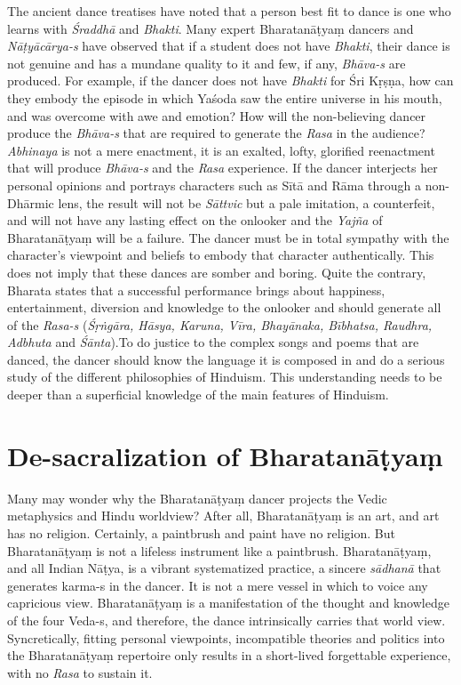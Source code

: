The ancient dance treatises have noted that a person best fit to dance is one who learns with \textit{Śraddhā} and \textit{Bhakti}. Many expert Bharatanāṭyaṃ dancers and \textit{Nāṭyācārya-s }have observed that if a student does not have \textit{Bhakti}, their dance is not genuine and has a mundane quality to it and few, if any, \textit{Bhāva-s} are produced. For example, if the dancer does not have \textit{Bhakti} for Śri Kṛṣṇa, how can they embody the episode in which Yaśoda saw the entire universe in his mouth, and was overcome with awe and emotion? How will the non-believing dancer produce the \textit{Bhāva-s} that are required to generate the \textit{Rasa} in the audience? \textit{Abhinaya} is not a mere enactment, it is an exalted, lofty, glorified reenactment that will produce \textit{Bhāva-s} and the \textit{Rasa} experience. If the dancer interjects her personal opinions and portrays characters such as Sītā and Rāma through a non-Dhārmic lens, the result will not be \textit{Sāttvic} but a pale imitation, a counterfeit, and will not have any lasting effect on the onlooker and the \textit{Yajña} of Bharatanāṭyaṃ will be a failure. The dancer must be in total sympathy with the character’s viewpoint and beliefs to embody that character authentically. This does not imply that these dances are somber and boring. Quite the contrary, Bharata states that a successful performance brings about happiness, entertainment, diversion and knowledge to the onlooker and should generate all of the \textit{Rasa-s} (\textit{Śṛṅgāra, Hāsya, Karuna, Vīra, Bhayānaka, Bībhatsa, Raudhra, Adbhuta} and \textit{Śānta}).To do justice to the complex songs and poems that are danced, the dancer should know the language it is composed in and do a serious study of the different philosophies of Hinduism. This understanding needs to be deeper than a superficial knowledge of the main features of Hinduism.


\section*{De-sacralization of Bharatanāṭyaṃ}

Many may wonder why the Bharatanāṭyaṃ dancer projects the Vedic metaphysics and Hindu worldview? After all, Bharatanāṭyaṃ is an art, and art has no religion. Certainly, a paintbrush and paint have no religion. But Bharatanāṭyaṃ is not a lifeless instrument like a paintbrush. Bharatanāṭyaṃ, and all Indian Nāṭya, is a vibrant systematized practice, a sincere \textit{sādhanā} that generates karma-s in the dancer. It is not a mere vessel in which to voice any capricious view. Bharatanāṭyaṃ is a manifestation of the thought and knowledge of the four Veda-s, and therefore, the dance intrinsically carries that world view. Syncretically, fitting personal viewpoints, incompatible theories and politics into the Bharatanāṭyaṃ repertoire only results in a short-lived forgettable experience, with no \textit{Rasa} to sustain it.

